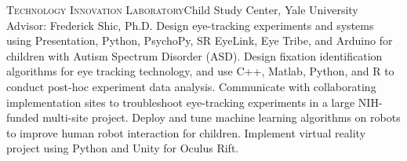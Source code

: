 \documentclass[11pt,letterpaper,roman]{moderncv} %
\begin{document}
{\newline{}\textsc{Technology Innovation Laboratory}}{Child Study Center, Yale University}{}
{
Advisor: Frederick Shic, Ph.D.
\newline{}
Design eye-tracking experiments and systems using Presentation, Python, PsychoPy, SR EyeLink, Eye Tribe, and Arduino for children with Autism Spectrum Disorder (ASD). 
Design fixation identification algorithms for eye tracking technology, and use C++, Matlab, Python, and R to conduct post-hoc experiment data analysis.
Communicate with collaborating implementation sites to troubleshoot eye-tracking experiments in a large NIH-funded multi-site project.
Deploy and tune machine learning algorithms on robots to improve human robot interaction for children.
Implement virtual reality project using Python and Unity for Oculus Rift. 
}

\end{document}
